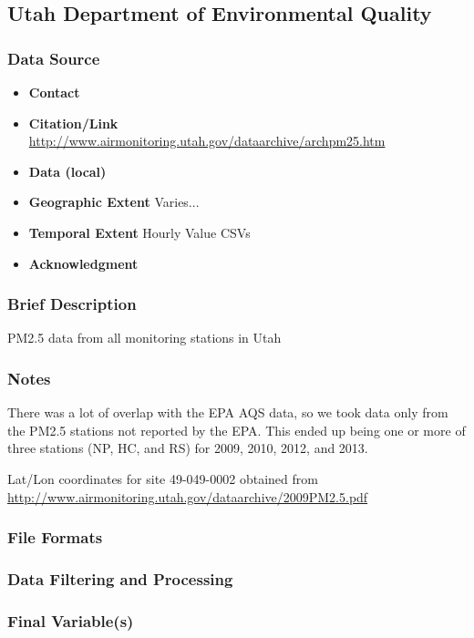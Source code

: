 \subsection{Utah Department of Environmental Quality }

\subsubsection*{Data Source}

\begin{itemize}[nolistsep]
\item \textbf{Contact} 
\item \textbf{Citation/Link} \url{http://www.airmonitoring.utah.gov/dataarchive/archpm25.htm}
\item \textbf{Data (local)} 
\item \textbf{Geographic Extent} Varies... 
\item \textbf{Temporal Extent} Hourly Value CSVs
\item \textbf{Acknowledgment} 
\end{itemize}

\subsubsection*{Brief Description} 
PM2.5 data from all monitoring stations in Utah

\subsubsection*{Notes} 
There was a lot of overlap with the EPA AQS data, so we took data only from the PM2.5 stations not reported by the EPA. 
This ended up being one or more of three stations (NP, HC, and RS) for 2009, 2010, 2012, and 2013.

Lat/Lon coordinates for site 49-049-0002 obtained from \url{http://www.airmonitoring.utah.gov/dataarchive/2009PM2.5.pdf}

\subsubsection*{File Formats} 

\subsubsection*{Data Filtering and Processing}

\subsubsection*{Final Variable(s)}

